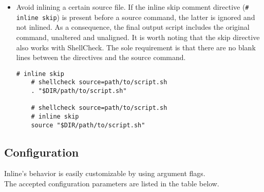 \begin{itemize}
  \item Avoid inlining a certain source file. If the inline skip comment
    directive (\texttt{\# inline skip}) is present before a source command, the
    latter is ignored and not inlined. As a consequence, the final output script
    includes the original command, unaltered and unaligned.
    \newline
    It is worth noting that the skip directive also works with ShellCheck. The sole
    requirement is that there are no blank lines between the directives and the source
    command.
    \newline
    \begin{lstlisting}[language=shell, alsoletter={.}, morekeywords={[2]{.}}, numbers=none, aboveskip=0pt, belowskip=0pt, abovecaptionskip=0pt, belowcaptionskip=0pt]
    # inline skip
    # shellcheck source=path/to/script.sh
    . "$DIR/path/to/script.sh"

    # shellcheck source=path/to/script.sh
    # inline skip
    source "$DIR/path/to/script.sh"
  \end{lstlisting}
\end{itemize}

\subsection{Configuration}
\label{subsec:corollary_projects_inline_configuration}

Inline's behavior is easily customizable by using argument flags. \\ %
The accepted configuration parameters are listed in the table below.

